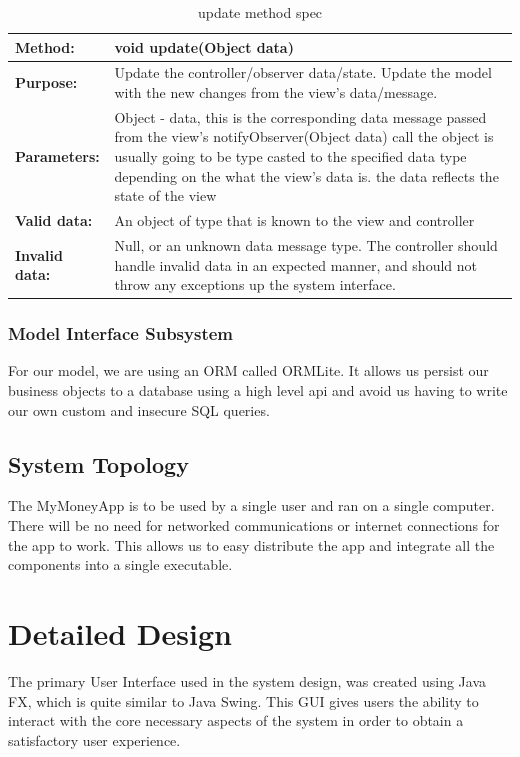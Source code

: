 \documentclass[12pt]{article}
\begin{document}
\begin{table}[H]
  \caption{update method spec}
  \begin{center}
    \begin{tabular}{|l|p{10cm}|}
      \hline
      \bf Method: & void update(Object data)\\
		\hline
      \bf Purpose: & Update the controller/observer data/state. Update the model with the new changes from the view’s data/message.\\
		\hline
      \bf Parameters: & Object - data, this is the corresponding data message passed from the view's notifyObserver(Object data) call the object is usually going to be type casted to the specified data type depending on the what the view's data is. the data reflects the state of the view\\
		\hline
      \bf Valid data: & An object of type that is known to the view and controller\\
      \hline
      \bf Invalid data: &  Null, or an unknown data message type. The controller should handle invalid data in an expected manner, and should not throw any exceptions up the system interface.\\
      \hline

    \end{tabular}
  \end{center}
\end{table}


\subsubsection{Model Interface Subsystem}
For our model, we are using an ORM called ORMLite. It allows us persist our business objects to a database using a high level api and avoid us having to write our own custom and insecure SQL queries. 

\subsection{System Topology}
The MyMoneyApp is to be used by a single user and ran on a single computer. There will be no need for networked communications or internet connections for the app to work. This allows us to easy distribute the app and integrate all the components into a single executable.


\section{Detailed Design}
The primary User Interface used in the system design, was created using Java FX, which is quite similar to Java Swing. This GUI gives users the ability to interact with the core necessary aspects of the system in order to obtain a satisfactory user experience.
\end{document}
